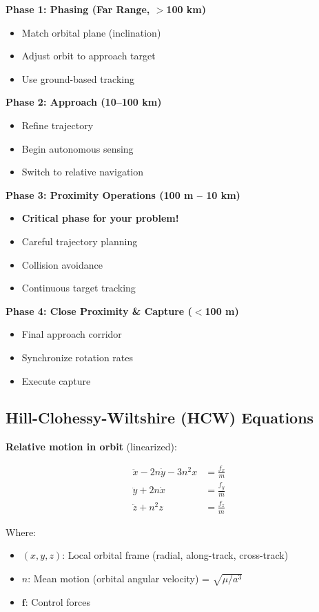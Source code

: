 \documentclass[11pt,a4paper]{article}
\begin{document}
\textbf{Phase 1: Phasing (Far Range, $>$100 km)}
\begin{itemize}[leftmargin=*]
    \item Match orbital plane (inclination)
    \item Adjust orbit to approach target
    \item Use ground-based tracking
\end{itemize}

\textbf{Phase 2: Approach (10--100 km)}
\begin{itemize}[leftmargin=*]
    \item Refine trajectory
    \item Begin autonomous sensing
    \item Switch to relative navigation
\end{itemize}

\textbf{Phase 3: Proximity Operations (100 m -- 10 km)}
\begin{itemize}[leftmargin=*]
    \item \textbf{Critical phase for your problem!}
    \item Careful trajectory planning
    \item Collision avoidance
    \item Continuous target tracking
\end{itemize}

\textbf{Phase 4: Close Proximity \& Capture ($<$100 m)}
\begin{itemize}[leftmargin=*]
    \item Final approach corridor
    \item Synchronize rotation rates
    \item Execute capture
\end{itemize}

\subsection{Hill-Clohessy-Wiltshire (HCW) Equations}

\textbf{Relative motion in orbit} (linearized):

\begin{align}
\ddot{x} - 2n\dot{y} - 3n^2x &= \frac{f_x}{m} \\
\ddot{y} + 2n\dot{x} &= \frac{f_y}{m} \\
\ddot{z} + n^2z &= \frac{f_z}{m}
\end{align}

Where:
\begin{itemize}[leftmargin=*]
    \item $(x, y, z)$: Local orbital frame (radial, along-track, cross-track)
    \item $n$: Mean motion (orbital angular velocity) = $\sqrt{\mu/a^3}$
    \item $\mathbf{f}$: Control forces
\end{itemize}
\end{document}

